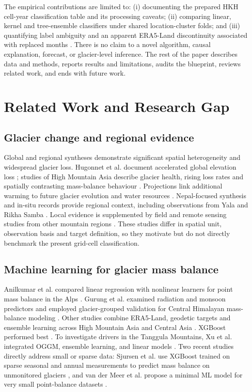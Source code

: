 \documentclass[conference]{IEEEtran}
\begin{document}
The empirical contributions are limited to: (i) documenting the prepared HKH cell-year classification table and its processing caveats; (ii) comparing linear, kernel and tree-ensemble classifiers under shared location-cluster folds; and (iii) quantifying label ambiguity and an apparent ERA5-Land discontinuity associated with replaced months \cite{ecmwfissue}. There is no claim to a novel algorithm, causal explanation, forecast, or glacier-level inference. The rest of the paper describes data and methods, reports results and limitations, audits the blueprint, reviews related work, and ends with future work.

\section{Related Work and Research Gap}\label{sec:related}
\subsection{Glacier change and regional evidence}
Global and regional syntheses demonstrate significant spatial heterogeneity and widespread glacier loss. Hugonnet et al. document accelerated global elevation loss \cite{hugonnet2021}; studies of High Mountain Asia describe glacier health, rising loss rates and spatially contrasting mass-balance behaviour \cite{miles2021,bhattacharya2021,barandun2021}. Projections link additional warming to future glacier evolution and water resources \cite{rounce2023}. Nepal-focused synthesis and in-situ records provide regional context, including observations from Yala and Rikha Samba \cite{khadka2023,stumm2021}. Local evidence is supplemented by field and remote sensing studies from other mountain regions \cite{mehta2021,zhang2021}. These studies differ in spatial unit, observation basis and target definition, so they motivate but do not directly benchmark the present grid-cell classification.

\subsection{Machine learning for glacier mass balance}
Anilkumar et al. compared linear regression with nonlinear learners for point mass balance in the Alps \cite{anilkumar2023}. Gurung et al. examined radiation and monsoon predictors and employed glacier-grouped validation for Central Himalayan mass-balance modeling \cite{gurung2025}. Other studies combine ERA5-Land, geodetic targets and ensemble learning across High Mountain Asia and Central Asia \cite{ren2024,peng2025}. XGBoost performed best \cite{peng2025}. To investigate drivers in the Tanggula Mountains, Xu et al. integrated OGGM, ensemble learning, and linear models \cite{xu2025}. Two recent studies directly address small or sparse data: Sjursen et al. use XGBoost trained on sparse seasonal and annual measurements to predict mass balance on unmonitored glaciers \cite{sjursen2025}, and van der Meer et al. propose a minimal ML model for very small point-balance datasets \cite{vanmeer2025}.
\end{document}

